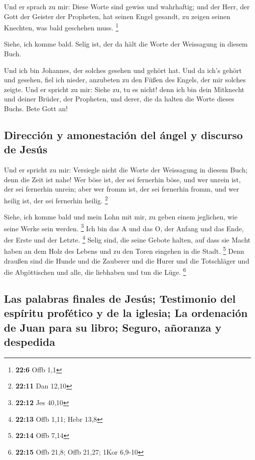  Und er sprach zu mir: Diese Worte sind gewiss und
wahrhaftig; und der Herr, der Gott der Geister der Propheten, hat seinen
Engel gesandt, zu zeigen seinen Knechten, was bald geschehen muss.
\footnote{\textbf{22:6} Offb 1,1}

 Siehe, ich komme bald. Selig ist, der da hält die Worte
der Weissagung in diesem Buch.

 Und ich bin Johannes, der solches gesehen und gehört hat.
Und da ich's gehört und gesehen, fiel ich nieder, anzubeten zu den Füßen
des Engels, der mir solches zeigte.  Und er spricht zu
mir: Siehe zu, tu es nicht! denn ich bin dein Mitknecht und deiner
Brüder, der Propheten, und derer, die da halten die Worte dieses Buchs.
Bete Gott an!

\hypertarget{direcciuxf3n-y-amonestaciuxf3n-del-uxe1ngel-y-discurso-de-jesuxfas}{%
\subsection{Dirección y amonestación del ángel y discurso de
Jesús}\label{direcciuxf3n-y-amonestaciuxf3n-del-uxe1ngel-y-discurso-de-jesuxfas}}

 Und er spricht zu mir: Versiegle nicht die Worte der
Weissagung in diesem Buch; denn die Zeit ist nahe!  Wer
böse ist, der sei fernerhin böse, und wer unrein ist, der sei fernerhin
unrein; aber wer fromm ist, der sei fernerhin fromm, und wer heilig ist,
der sei fernerhin heilig. \footnote{\textbf{22:11} Dan 12,10}

 Siehe, ich komme bald und mein Lohn mit mir, zu geben
einem jeglichen, wie seine Werke sein werden. \footnote{\textbf{22:12}
  Jes 40,10}  Ich bin das A und das O, der Anfang und das
Ende, der Erste und der Letzte. \footnote{\textbf{22:13} Offb 1,11; Hebr
  13,8}  Selig sind, die seine Gebote halten, auf dass
sie Macht haben an dem Holz des Lebens und zu den Toren eingehen in die
Stadt. \footnote{\textbf{22:14} Offb 7,14}  Denn draußen
sind die Hunde und die Zauberer und die Hurer und die Totschläger und
die Abgöttischen und alle, die liebhaben und tun die Lüge. \footnote{\textbf{22:15}
  Offb 21,8; Offb 21,27; 1Kor 6,9-10}

\hypertarget{las-palabras-finales-de-jesuxfas-testimonio-del-espuxedritu-profuxe9tico-y-de-la-iglesia-la-ordenaciuxf3n-de-juan-para-su-libro-seguro-auxf1oranza-y-despedida}{%
\subsection{Las palabras finales de Jesús; Testimonio del espíritu
profético y de la iglesia; La ordenación de Juan para su libro; Seguro,
añoranza y
despedida}\label{las-palabras-finales-de-jesuxfas-testimonio-del-espuxedritu-profuxe9tico-y-de-la-iglesia-la-ordenaciuxf3n-de-juan-para-su-libro-seguro-auxf1oranza-y-despedida}}

